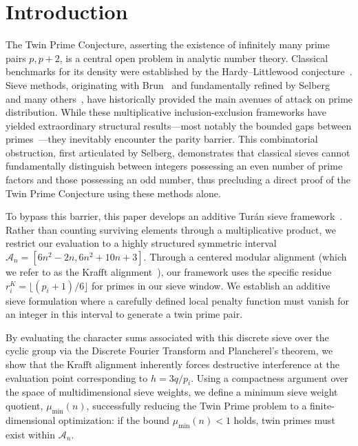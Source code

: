 \documentclass{ws-ijnt}
\begin{document}


\section{Introduction} \label{introduction}

The Twin Prime Conjecture, asserting the existence of infinitely many prime pairs $p, p+2$,
is a central open problem in analytic number theory. Classical benchmarks for its density were
established by the Hardy--Littlewood conjecture~\cite{HardyLittlewood1923}. Sieve methods,
originating with Brun~\cite{Brun1919} and fundamentally refined by Selberg~\cite{Selberg1947} and
many others~\cite{MontgomeryVaughan2006}, have historically provided the main avenues of attack on
prime distribution. While these multiplicative inclusion-exclusion frameworks have yielded
extraordinary structural results---most notably the bounded gaps between
primes~\cite{GPY2009,Maynard2015,Polymath8a,Polymath8b}---they inevitably encounter the parity
barrier. This combinatorial obstruction, first articulated by Selberg, demonstrates that classical
sieves cannot fundamentally distinguish between integers possessing an even number of prime factors
and those possessing an odd number, thus precluding a direct proof of the Twin Prime Conjecture
using these methods alone.

To bypass this barrier, this paper develops an additive Turán sieve framework~\cite{Turan1934}. Rather
than counting surviving elements through a multiplicative product, we restrict our evaluation to a
highly structured symmetric interval $\mathcal{A}_n = [6n^2 - 2n, 6n^2 + 10n + 3]$. Through a centered
modular alignment (which we refer to as the Krafft alignment~\cite{Krafft1801,Portela2026}), our
framework uses the specific residue $r^K_i = \lfloor(p_i+1)/6\rfloor$ for primes in our sieve window.
We establish an additive sieve formulation where a carefully defined local penalty function must vanish
for an integer in this interval to generate a twin prime pair.

By evaluating the character sums associated with this discrete sieve over the cyclic group via the
Discrete Fourier Transform and Plancherel's theorem, we show that the Krafft alignment inherently
forces destructive interference at the evaluation point corresponding to $h = 3q/p_i$.
Using a compactness argument over the space of multidimensional sieve weights, we define a minimum
sieve weight quotient, $\mu_{\min}(n)$, successfully reducing the Twin Prime problem to a
finite-dimensional optimization: if the bound $\mu_{\min}(n) < 1$ holds, twin primes must exist within
$\mathcal{A}_n$.
\end{document}
